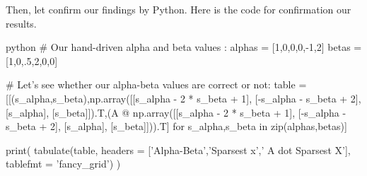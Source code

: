 \documentclass[12pt]{amsart}
\begin{document}
Then, let confirm our findings by Python. Here is the code for confirmation our results.
\begin{mintedbox}{python}
# Our hand-driven alpha and beta values :
alphas = [1,0,0,0,-1,2]
betas  = [1,0,.5,2,0,0]

# Let's see whether our alpha-beta values are correct or not:
table = [[(s_alpha,s_beta),np.array([[s_alpha - 2 * s_beta + 1],
                                    [-s_alpha - s_beta + 2],
                                    [s_alpha],
                                    [s_beta]]).T,(A @ np.array([[s_alpha - 2 * s_beta + 1],
                                    [-s_alpha - s_beta + 2],
                                    [s_alpha],
                                    [s_beta]])).T] for  s_alpha,s_beta in zip(alphas,betas)]
                                  
print(
tabulate(table,
headers = ['Alpha-Beta','Sparsest x',' A dot Sparsest X'],
tablefmt = 'fancy_grid')
)

\end{mintedbox}
\vspace{5mm}
\begin{table}[ht]
    \centering
    \vspace{3mm}\caption{Table shows the $\alpha$-$\beta$ tuples with corresponding sparsest solution with validations}
\end{table}

\end{document}
